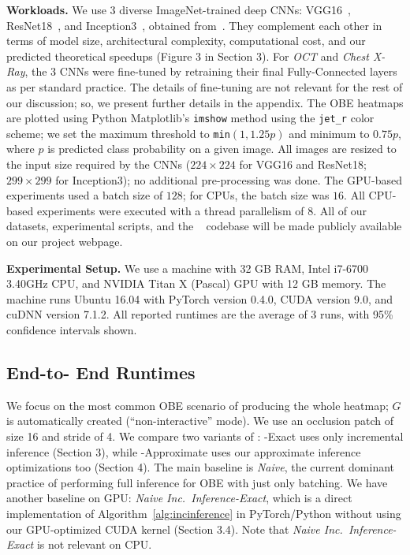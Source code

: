 \vspace{2mm}
\noindent \textbf{Workloads.}
We use 3 diverse ImageNet-trained deep CNNs: VGG16~\cite{vggnet}, ResNet18~\cite{resnet}, and Inception3~\cite{inception}, obtained from~\cite{torchvisionmodels}. They complement each other in terms of model size, architectural complexity, computational cost, and our predicted theoretical speedups (Figure 3 in Section 3). For \textit{OCT} and \textit{Chest X-Ray}, the 3 CNNs were fine-tuned by retraining their final Fully-Connected layers as per standard practice. The details of fine-tuning are not relevant for the rest of our discussion; so, we present further details in the appendix. The OBE heatmaps are plotted using Python Matplotlib's \texttt{imshow} method using the \texttt{jet\_r} color scheme; we set the maximum threshold to \texttt{min}$(1, 1.25 p)$ and minimum to $0.75 p$, where $p$ is predicted class probability on a given image. All images are resized to the input size required by the CNNs ($224\times224$ for VGG16 and ResNet18; $299\times299$ for Inception3); no additional pre-processing was done. The GPU-based experiments used a batch size of $128$; for CPUs, the batch size was $16$. All CPU-based experiments were executed with a thread parallelism of $8$. All of our datasets, experimental scripts, and the \system~ codebase will be made publicly available on our project webpage.

\vspace{2mm}
\noindent \textbf{Experimental Setup.}
We use a machine with 32 GB RAM, Intel i7-6700 3.40GHz CPU, and NVIDIA Titan X (Pascal) GPU with 12 GB memory. %
The machine runs Ubuntu 16.04 with PyTorch version 0.4.0, CUDA version 9.0, and cuDNN version 7.1.2.
All reported runtimes are the average of 3 runs, with 95\% confidence intervals shown.

\vspace{-2mm}
\subsection{End-to- End Runtimes}\label{sec:end_to_end}

We focus on the most common OBE scenario of producing the whole heatmap; $G$ is automatically created (``non-interactive'' mode). We use an occlusion patch of size 16 and stride of 4. We compare two variants of \system: \system-Exact uses only incremental inference (Section 3), while \system-Approximate uses our approximate inference optimizations too (Section 4). The main baseline is \textit{Naive}, the current dominant practice of performing full inference for OBE with just only batching. We have another baseline on GPU: \textit{Naive Inc.~Inference-Exact}, which is a direct implementation of Algorithm~\ref{alg:incinference} in PyTorch/Python without using our GPU-optimized CUDA kernel (Section 3.4). Note that \textit{Naive Inc.~Inference-Exact} is not relevant on CPU.

